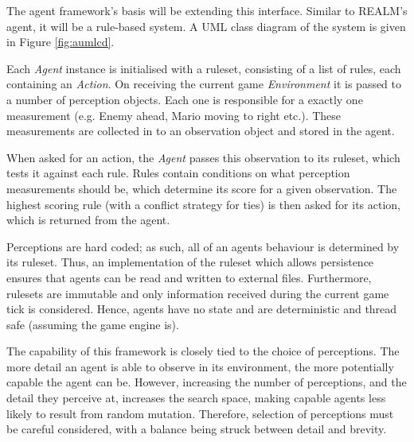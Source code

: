 The agent framework's basis will be extending this interface. Similar to REALM's agent, it will be a rule-based system. A UML class diagram of the system is given in Figure \ref{fig:aumlcd}.

\vspace{\baselineskip}

Each \emph{Agent} instance is initialised with a ruleset, consisting of a list of rules, each containing an \emph{Action}. On receiving the current game \emph{Environment} it is passed to a number of perception objects. Each one is responsible for a exactly one measurement (e.g. Enemy ahead, Mario moving to right etc.). These measurements are collected in to an observation object and stored in the agent.

When asked for an action, the \emph{Agent} passes this observation to its ruleset, which tests it against each rule. Rules contain conditions on what perception measurements should be, which determine its score for a given observation. The highest scoring rule (with a conflict strategy for ties) is then asked for its action, which is returned from the agent.

\vspace{\baselineskip}

Perceptions are hard coded; as such, all of an agents behaviour is determined by its ruleset. Thus, an implementation of the ruleset which allows persistence ensures that agents can be read and written to external files. Furthermore, rulesets are immutable and only information received during the current game tick is considered. Hence, agents have no state and are deterministic and thread safe (assuming the game engine is).

The capability of this framework is closely tied to the choice of perceptions. The more detail an agent is able to observe in its environment, the more potentially capable the agent can be. However, increasing the number of perceptions, and the detail they perceive at, increases the search space, making capable agents less likely to result from random mutation. Therefore, selection of perceptions must be careful considered, with a balance being struck between detail and brevity. 

